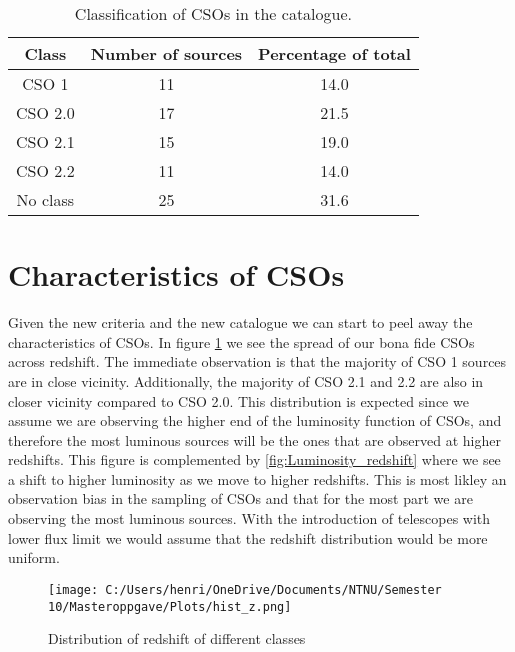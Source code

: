 \begin{table}
    \caption{Classification of CSOs in the catalogue.}
    \label{tab:CSO_class}
    \centering
    \begin{tabular}{@{}ccc@{}}
        \toprule
        Class & Number of sources & Percentage of total  \\ \midrule
        CSO 1 & 11 & 14.0  \\
        CSO 2.0 & 17 & 21.5  \\
        CSO 2.1 & 15 & 19.0  \\
        CSO 2.2 & 11 & 14.0  \\
        No class & 25 & 31.6  \\
        \bottomrule
    \end{tabular}
\end{table}
\newpage


\section{Characteristics of CSOs}
Given the new criteria and the new catalogue we can start to peel away the characteristics of CSOs. In figure \ref{fig:redshift_hist} we see the spread of our bona fide CSOs across redshift. The immediate observation is that the majority of CSO 1 sources are in close vicinity. Additionally, the majority of CSO 2.1 and 2.2 are also in closer vicinity compared to CSO 2.0. This distribution is expected since we assume we are observing the higher end of the luminosity function of CSOs, and therefore the most luminous sources will be the ones that are observed at higher redshifts. This figure is complemented by \ref{fig:Luminosity_redshift} where we see a shift to higher luminosity as we move to higher redshifts. This is most likley an observation bias in the sampling of CSOs and that for the most part we are observing the most luminous sources. With the introduction of telescopes with lower flux limit we would assume that the redshift distribution would be more uniform. 

\begin{figure}
    \centering
    \texttt{[image: C:/Users/henri/OneDrive/Documents/NTNU/Semester 10/Masteroppgave/Plots/hist\_z.png]}
    \caption{Distribution of redshift of different classes}
    \label{fig:redshift_hist}
\end{figure}


